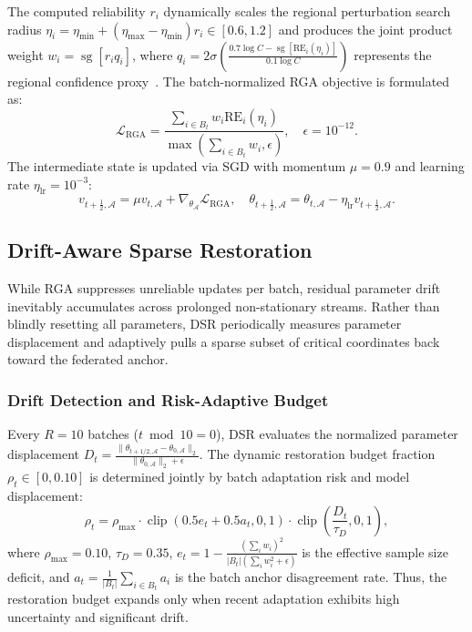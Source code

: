 \documentclass[journal]{IEEEtran}
\DeclareMathOperator{\sg}{sg}
\DeclareMathOperator{\clip}{clip}
\begin{document}
The computed reliability $r_i$ dynamically scales the regional perturbation search radius $\eta_i = \eta_{\min} + (\eta_{\max} - \eta_{\min}) r_i \in [0.6, 1.2]$ and produces the joint product weight $w_i = \sg[r_i q_i]$, where $q_i = 2\sigma(\frac{0.7 \log C - \sg[\mathrm{RE}_i(\eta_i)]}{0.1 \log C})$ represents the regional confidence proxy~\cite{10}. The batch-normalized RGA objective is formulated as:
\begin{equation}
\label{eq:rga_loss}
\mathcal{L}_{\mathrm{RGA}} = \frac{\sum_{i \in B_t} w_i \mathrm{RE}_i(\eta_i)}{\max\left(\sum_{i \in B_t} w_i, \epsilon\right)}, \quad \epsilon = 10^{-12}.
\end{equation}
The intermediate state is updated via SGD with momentum $\mu = 0.9$ and learning rate $\eta_{\mathrm{lr}} = 10^{-3}$:
\begin{equation*}
v_{t+\frac{1}{2}, \mathcal{A}} = \mu v_{t, \mathcal{A}} + \nabla_{\theta_{\mathcal{A}}} \mathcal{L}_{\mathrm{RGA}}, \quad \theta_{t+\frac{1}{2}, \mathcal{A}} = \theta_{t, \mathcal{A}} - \eta_{\mathrm{lr}} v_{t+\frac{1}{2}, \mathcal{A}}.
\end{equation*}

\subsection{Drift-Aware Sparse Restoration}
While RGA suppresses unreliable updates per batch, residual parameter drift inevitably accumulates across prolonged non-stationary streams. Rather than blindly resetting all parameters, DSR periodically measures parameter displacement and adaptively pulls a sparse subset of critical coordinates back toward the federated anchor.

\subsubsection{Drift Detection and Risk-Adaptive Budget}
Every $R = 10$ batches ($t \bmod 10 = 0$), DSR evaluates the normalized parameter displacement $D_t = \frac{\|\theta_{t+1/2, \mathcal{A}} - \theta_{0, \mathcal{A}}\|_2}{\|\theta_{0, \mathcal{A}}\|_2 + \epsilon}$. The dynamic restoration budget fraction $\rho_t \in [0, 0.10]$ is determined jointly by batch adaptation risk and model displacement:
\begin{equation}
\label{eq:restoration_budget}
\rho_t = \rho_{\max} \cdot \clip(0.5 e_t + 0.5 a_t, 0, 1) \cdot \clip\left(\frac{D_t}{\tau_D}, 0, 1\right),
\end{equation}
where $\rho_{\max} = 0.10$, $\tau_D = 0.35$, $e_t = 1 - \frac{(\sum_i w_i)^2}{|B_t|(\sum_i w_i^2 + \epsilon)}$ is the effective sample size deficit, and $a_t = \frac{1}{|B_t|}\sum_{i \in B_t} a_i$ is the batch anchor disagreement rate. Thus, the restoration budget expands only when recent adaptation exhibits high uncertainty and significant drift.
\end{document}

